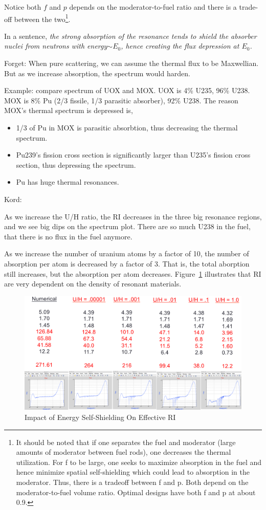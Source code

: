 \documentclass{school-22.211-notes}
\begin{document}
Notice both $f$ and $p$ depends on the moderator-to-fuel ratio and there is a trade-off
between the two\footnote{It should be noted that if one separates the fuel and moderator (large amounts of
moderator between fuel rods), one decreases the thermal utilization. For f to be
large, one seeks to maximize absorption in the fuel and hence minimize spatial
self-shielding which could lead to absorption in the moderator. Thus, there is a
tradeoff between f and p. Both depend on the moderator-to-fuel volume ratio.
Optimal designs have both f and p at about 0.9.}. 

In a sentence, \textit{the strong absorption of the resonance tends to shield the absorber nuclei from neutrons with energy$\sim E_0$, hence creating the flux depression at $E_0$.}

Forget: When pure scattering, we can assume the thermal flux to be Maxwellian. But as we increase absorption, the spectrum would harden. 

Example: compare spectrum of UOX and MOX. UOX is 4\% U235, 96\% U238. MOX is 8\% Pu (2/3 fissile, 1/3 parasitic absorber), 92\% U238. The reason MOX's thermal spectrum is depressed is, 
\begin{itemize}
\item 1/3 of Pu in MOX is parasitic absorbtion, thus decreasing the thermal spectrum. 
\item Pu239's fission cross section is significantly larger than U235's fission cross section, thus depressing the spectrum.
\item Pu has huge thermal resonances. 
\end{itemize}




Kord: 

As we increase the U/H ratio, the RI decreases in the three big resonance regions, and we see big dips on the spectrum plot. There are so much U238 in the fuel, that there is no flux in the fuel anymore. 

As we increase the number of uranium atoms by a factor of 10, the number of absorption per atom is decreased by a factor of 3. That is, the total aborption still increases, but the absorption per atom decreases. Figure~\ref{energy-self-shielding} illustrates that RI are very dependent on the density of resonant materials.
\begin{figure}
  \centering
  \includegraphics[width=4.5in]{images/r-m/self-shielding.png}
  \caption{Impact of Energy Self-Shielding On Effective RI} \label{energy-self-shielding}
\end{figure}
\end{document}
